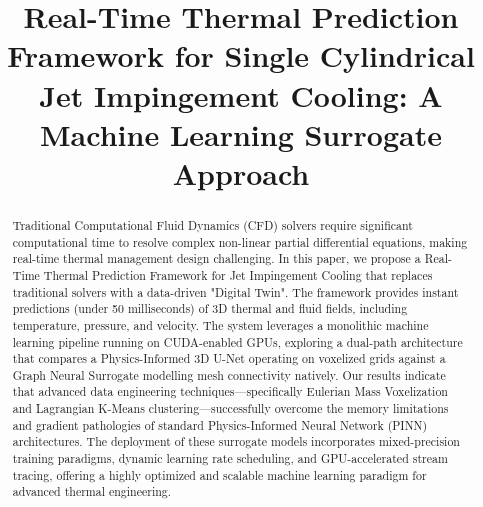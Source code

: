 \documentclass[conference]{IEEEtran}
\begin{document}
\title{Real-Time Thermal Prediction Framework for Single Cylindrical Jet Impingement Cooling: A Machine Learning Surrogate Approach}

\author{
}

\maketitle

\begin{abstract}
Traditional Computational Fluid Dynamics (CFD) solvers require significant computational time to resolve complex non-linear partial differential equations, making real-time thermal management design challenging. In this paper, we propose a Real-Time Thermal Prediction Framework for Jet Impingement Cooling that replaces traditional solvers with a data-driven "Digital Twin". The framework provides instant predictions (under 50 milliseconds) of 3D thermal and fluid fields, including temperature, pressure, and velocity. The system leverages a monolithic machine learning pipeline running on CUDA-enabled GPUs, exploring a dual-path architecture that compares a Physics-Informed 3D U-Net operating on voxelized grids against a Graph Neural Surrogate modelling mesh connectivity natively. Our results indicate that advanced data engineering techniques—specifically Eulerian Mass Voxelization and Lagrangian K-Means clustering—successfully overcome the memory limitations and gradient pathologies of standard Physics-Informed Neural Network (PINN) architectures. The deployment of these surrogate models incorporates mixed-precision training paradigms, dynamic learning rate scheduling, and GPU-accelerated stream tracing, offering a highly optimized and scalable machine learning paradigm for advanced thermal engineering.
\end{abstract}
\end{document}

